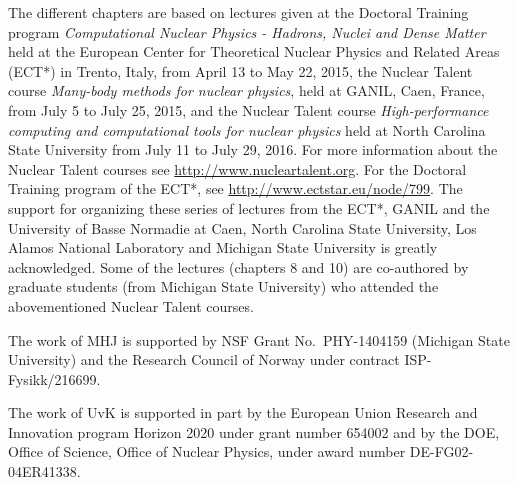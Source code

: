 \begin{acknowledgement}
The different chapters are based on lectures given at the Doctoral Training program {\em Computational Nuclear Physics - Hadrons, Nuclei and Dense Matter} held at  the European Center for Theoretical Nuclear Physics
and Related Areas (ECT*) in Trento, Italy, from April 13 to May 22, 2015, the Nuclear Talent course {\em Many-body methods for nuclear physics}, held at GANIL, Caen, France, from July 5 to July 25,  2015, and the Nuclear Talent course {\em High-performance computing and computational tools for nuclear physics} held at North Carolina State University from July 11 to July 29, 2016. For more information about the Nuclear Talent courses see \url{http://www.nucleartalent.org}. For the Doctoral Training program of the ECT*, see \url{http://www.ectstar.eu/node/799}.
The support for organizing these series of lectures from the ECT*, GANIL and the University of Basse Normadie at Caen, North Carolina State University, Los Alamos National Laboratory and Michigan State University is greatly acknowledged.   Some of the lectures (chapters 8 and 10) are co-authored by graduate students (from Michigan State University) who  attended the abovementioned Nuclear Talent courses.


The work of MHJ is supported by NSF Grant No.~PHY-1404159 (Michigan
State University) and the Research Council of Norway under contract
ISP-Fysikk/216699.

The work of UvK is supported in part by the European Union Research
and Innovation program Horizon 2020 under grant number 654002 and by
the DOE, Office of Science, Office of Nuclear Physics, under award
number DE-FG02-04ER41338.

\end{acknowledgement}




